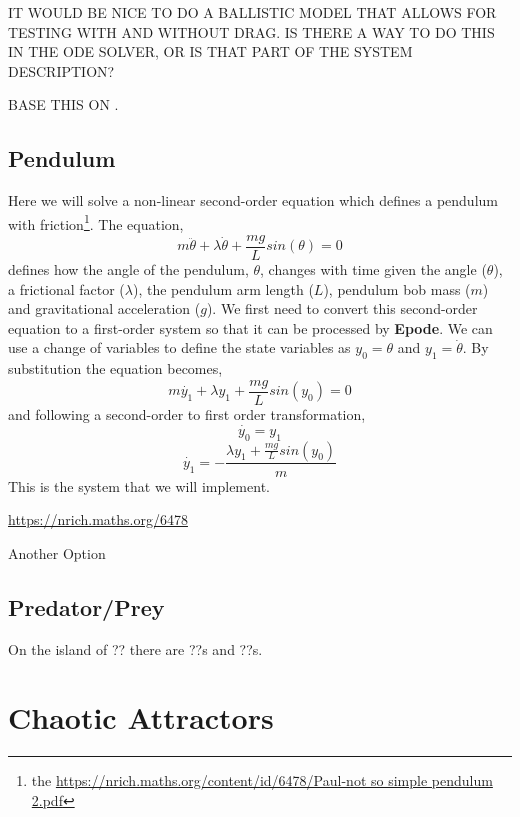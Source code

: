 \documentclass[letterpaper,10pt]{book}
\newcommand{\epode}[0]{\textbf{Epode}}
\begin{document}
      IT WOULD BE NICE TO DO A BALLISTIC MODEL THAT ALLOWS FOR TESTING WITH AND WITHOUT DRAG.  IS THERE A WAY TO DO THIS IN THE ODE SOLVER, OR IS THAT PART OF THE SYSTEM DESCRIPTION?
      
      BASE THIS ON \cite{wade2011going}.

    \section{Pendulum}
      Here we will solve a non-linear second-order equation which defines a pendulum with friction\footnote{the \url{https://nrich.maths.org/content/id/6478/Paul-not so simple pendulum 2.pdf}}.  The equation,
      \begin{equation}
	m\ddot{\theta} + \lambda\dot{\theta} + \frac{m g}{L}sin(\theta) = 0
      \end{equation}
      defines how the angle of the pendulum, $\theta$, changes with time given the angle ($\theta$), a frictional factor ($\lambda$), the pendulum arm length ($L$), pendulum bob mass ($m$) and gravitational acceleration ($g$).  We first need to convert this second-order equation to a first-order system so that it can be processed by \epode{}.  We can use a change of variables to define the state variables as $y_{0} = \theta$ and $y_{1} = \dot{\theta}$.  By substitution the equation becomes,
      \begin{equation}
	m\dot{y_1} + \lambda{}y_1 + \frac{m g}{L}sin(y_0) = 0
      \end{equation}
      and following a second-order to first order transformation,
      \begin{equation}
	\dot{y_0} = y_{1}
      \end{equation}
      \begin{equation}
	\dot{y_1} = -\frac{\lambda{}y_{1} + \frac{m g}{L}sin(y_0)}{m}
      \end{equation}
      This is the system that we will implement.
      
      \url{https://nrich.maths.org/6478}
      
      Another Option\cite{nelson1986pendulum}

      
    \section{Predator/Prey}
      On the island of ?? there are ??s and ??s.
      
  \chapter{Chaotic Attractors}
\end{document}
